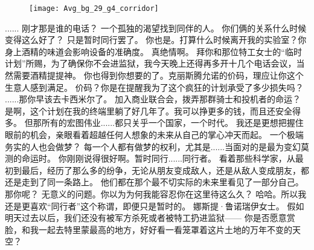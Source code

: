 \documentclass[openany]{book}
\begin{document}
\begin{figure}[h]
    \centering
    \texttt{[image: Avg\_bg\_29\_g4\_corridor]}
\end{figure}
\begin{dialogue}
     ......
     刚才那是谁的电话？
     一个孤独的渴望找到同伴的人。
     你们俩的关系什么时候变得这么好了？
     只是暂时同行罢了。
     你也是。打算什么时候离开我的实验室？你身上酒精的味道会影响设备的准确度。
     真绝情啊。
     拜你和那位特工女士的“临时计划”所赐，为了确保你不会进监狱，我今天晚上还得再多开十几个电话会议，当然需要酒精提提神。
     你也得到你想要的了。克丽斯腾允诺的价码，理应让你这个生意人感到满足。
     价码？你是在提醒我为了这个疯狂的计划承受了多少损失吗？
     ......那你早该去卡西米尔了。
     加入商业联合会，拨弄那群骑士和投机者的命运？
     是啊，这个计划在我的终端里躺了好几年了。我可以挣更多的钱，而且还安全得多。
     但那所有的宏图伟业......都只关乎一个国家，一个时代。
     我还是更想把握住眼前的机会，亲眼看着超越任何人想象的未来从自己的掌心冲天而起。
     一个极端务实的人也会做梦？
     每一个人都有做梦的权利，尤其是......当面对的是最为变幻莫测的命运时。
     你刚刚说得很好啊。暂时同行......同行者。
     看着那些科学家，从最初到最后，经历了那么多的纷争，无论从朋友变成敌人，还是从敌人变成朋友，都还是走到了同一条路上。
     他们都在那个最不切实际的未来里看见了一部分自己。
     那你呢？
     无意义的问题。你以为为何我能容忍你在这里待这么久？
     哈哈。所以我还是更喜欢“同行者”这个称谓，即便只是暂时的。
     娜斯提·鲁诺瑞伊女士。
     假如明天过去以后，我们还没有被军方杀死或者被特工扔进监狱——
     你是否愿意赏脸，和我一起去特里蒙最高的地方，好好看一看笼罩着这片土地的万年不变的天空？
\end{dialogue}
\end{document}
